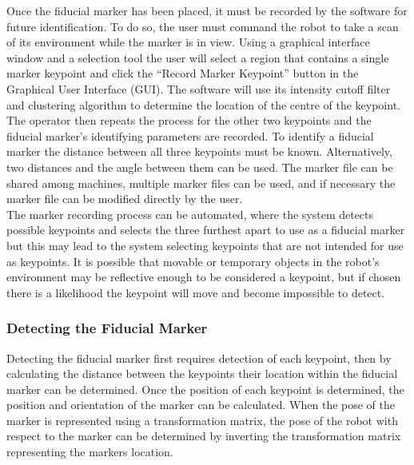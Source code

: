 Once the fiducial marker has been placed, it must be recorded by the software for future identification. To do so, the user must command the robot to take a scan of its environment while the marker is in view. Using a graphical interface window and a selection tool the user will select a region that contains a single marker keypoint and click the ``Record Marker Keypoint'' button in the Graphical User Interface (GUI). The software will use its intensity cutoff filter and clustering algorithm to determine the location of the centre of the keypoint. The operator then repeats the process for the other two keypoints and the fiducial marker's identifying parameters are recorded. To identify a fiducial marker the distance between all three keypoints must be known. Alternatively, two distances and the angle between them can be used. The marker file can be shared among machines, multiple marker files can be used, and if necessary the marker file can be modified directly by the user.\\

The marker recording process can be automated, where the system detects possible keypoints and selects the three furthest apart to use as a fiducial marker but this may lead to the system selecting keypoints that are not intended for use as keypoints. It is possible that movable or temporary objects in the robot's environment may be reflective enough to be considered a keypoint, but if chosen there is a likelihood the keypoint will move and become impossible to detect.\\

\subsubsection{Detecting the Fiducial Marker}

Detecting the fiducial marker first requires detection of each keypoint, then by calculating the distance between the keypoints their location within the fiducial marker can be determined. Once the position of each keypoint is determined, the position and orientation of the marker can be calculated. When the pose of the marker is represented using a transformation matrix, the pose of the robot with respect to the marker can be determined by inverting the transformation matrix representing the markers location.\\

